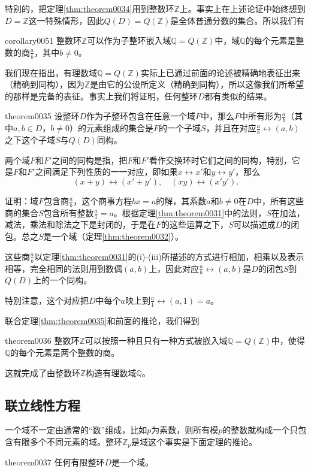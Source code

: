 特别的，把定理\ref{thm:theorem0034}用到整数环$\mathbb{Z}$上。事实上在上述论证中始终想到$D=\mathbb{Z}$这一特殊情形，因此$Q(D)=Q(\mathbb{Z})$是全体普通分数的集合。所以我们有
\begin{corollary}{}{corollary0051}
整数环$\mathbb{Z}$可以作为子整环嵌入域$\mathbb{Q}=Q(\mathbb{Z})$中，域$\mathbb{Q}$的每个元素是整数的商$\frac{a}{b}$，其中$b \neq 0$。
\end{corollary}

我们现在指出，有理数域$\mathbb{Q}=Q(\mathbb{Z})$实际上已通过前面的论述被精确地表征出来（精确到同构），因为$\mathbb{Z}$是由它的公设所定义（精确到同构），所以这像我们所希望的那样是完备的表征。事实上我们将证明，任何整环$D$都有类似的结果。
\begin{theorem}{}{theorem0035}
设整环$D$作为子整环包含在任意一个域$F$中，那么$F$中所有形为$\frac{a}{b}$（其中$a, b \in D$，$b \neq 0$）的元素组成的集合是$F$的一个子域$S$，并且在对应$\frac{a}{b} \leftrightarrow (a, b)$之下这个子域$S$与$Q(D)$同构。
\end{theorem}
两个域$F$和$F'$之间的同构是指，把$F$和$F'$看作交换环时它们之间的同构，特别，它是$F$和$F'$之间满足下列性质的一一对应，即如果$x \leftrightarrow x'$和$y \leftrightarrow y'$，那么
\[
(x+y) \leftrightarrow (x'+y'), \quad (xy) \leftrightarrow (x'y').
\]

证明：域$F$包含商$\frac{a}{b}$，这个商事方程$bx=a$的解，其系数$a$和$b \neq 0$在$D$中，所有这些商的集合$S$包含所有整数$\frac{a}{1}=a$。根据定理\ref{thm:theorem0031}中的法则，$S$在加法，减法，乘法和除法之下是封闭的，于是在$F$的这些运算之下，$S$可以描述成$D$的闭包。总之$S$是一个域（定理\ref{thm:theorem0032}）。

这些商$\frac{a}{b}$以定理\ref{thm:theorem0031}的(i)-(iii)所描述的方式进行相加，相乘以及表示相等，完全相同的法则用到数偶$(a,b)$上，因此对应$\frac{a}{b} \leftrightarrow (a, b)$是$D$的闭包$S$到$Q(D)$上的一个同构。

特别注意，这个对应把$D$中每个$a$映上到$\frac{a}{1} \leftrightarrow (a,1)=a$。

联合定理\ref{thm:theorem0035}和前面的推论，我们得到
\begin{theorem}{}{theorem0036}
整数环$\mathbb{Z}$可以按照一种且只有一种方式被嵌入域$\mathbb{Q}=Q(\mathbb{Z})$中，使得$\mathbb{Q}$的每个元素是两个整数的商。
\end{theorem}

这就完成了由整数环$\mathbb{Z}$构造有理数域$\mathbb{Q}$。

\subsection{联立线性方程}
一个域不一定由通常的“数”组成，比如$p$为素数，则所有模$p$的整数就构成一个只包含有限多个不同元素的域。整环$\mathbb{Z}_p$是域这个事实是下面定理的推论。
\begin{theorem}{}{theorem0037}
任何有限整环$D$是一个域。
\end{theorem}

